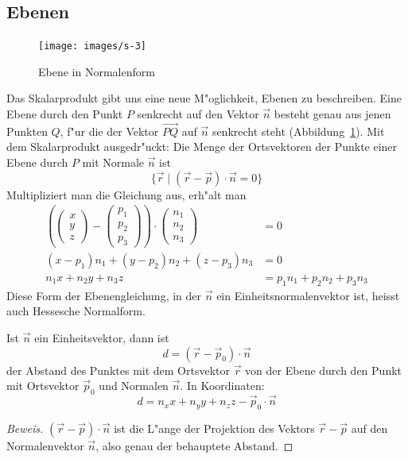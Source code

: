\subsection{Ebenen}
\begin{figure}
\begin{center}
\texttt{[image: images/s-3]}
\end{center}
\caption{Ebene in Normalenform\label{image-normalenform}}
\end{figure}
Das Skalarprodukt gibt uns eine neue M"oglichkeit, Ebenen zu
beschreiben.
Eine Ebene durch den Punkt $P$ senkrecht auf den Vektor
$\vec n$ besteht genau aus jenen Punkten $Q$, f"ur die der Vektor
$\overset{\rightarrow}{PQ}$ auf $\vec n$ senkrecht steht
(Abbildung~\ref{image-normalenform}). Mit dem Skalarprodukt
ausgedr"uckt: Die Menge der Ortsvektoren der Punkte einer Ebene durch $P$ mit
Normale $\vec n$ ist
\[
\{\vec r\;|\;(\vec r-\vec p)\cdot \vec n=0\}
\]
Multipliziert man die Gleichung aus, erh"alt man
\begin{align*}
\left(
\begin{pmatrix}x\\y\\z\end{pmatrix}
-\begin{pmatrix}p_1\\p_2\\p_3\end{pmatrix}\right)\cdot
\begin{pmatrix}n_1\\n_2\\n_3\end{pmatrix}&=0
\\
(x-p_1)n_1+(y-p_2)n_2+(z-p_3)n_3&=0
\\
n_1x+n_2y+n_3z&=p_1n_1+p_2n_2+p_3n_3
\end{align*}
Diese Form der Ebenengleichung, in der $\vec n$ ein Einheitsnormalenvektor ist,
heisst auch Hessesche Normalform.

\begin{satz}
Ist $\vec n$ ein Einheitsvektor, dann ist
\[
d=(\vec r-\vec p_0)\cdot \vec n
\]
der Abstand des Punktes mit dem Ortsvektor $\vec r$ von der Ebene durch
den Punkt mit Ortsvektor $\vec p_0$ und Normalen $\vec n$. In Koordinaten:
\[
d=n_xx+n_yy+n_zz-\vec p_0\cdot\vec n
\]
\end{satz}
\begin{proof}[Beweis]
$(\vec r-\vec p)\cdot \vec n$ ist die L"ange der Projektion des Vektors
$\vec r -\vec p$ auf den Normalenvektor $\vec n$, also genau der behauptete
Abstand.
\end{proof}

